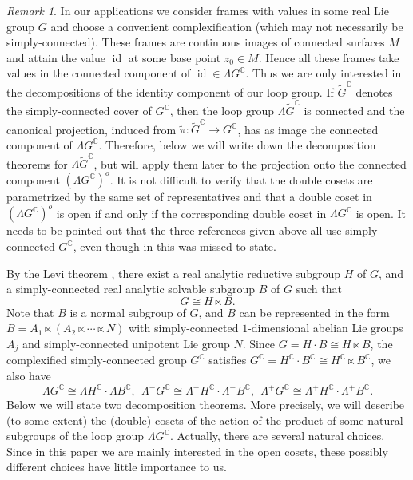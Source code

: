 \documentclass[12pt]{amsart}
\theoremstyle{definition}
\theoremstyle{remark}
\newtheorem{Remark}[Theorem]{Remark}
\numberwithin{equation}{section}
\begin{document}
\begin{Remark} In our applications we consider frames with values in 
 some real Lie group $G$ and choose a convenient complexification 
 (which may not necessarily be simply-connected). These frames 
 are continuous images of connected surfaces $M$ and attain the value ${\operatorname{id}}$ 
 at some base point $z_0 \in M$. Hence all these frames take values in 
 the connected component of  ${\operatorname{id}} \in \Lambda G^{\mathbb{C}}$. 
 Thus we are only interested in the decompositions of the identity component 
 of our loop group.
 If $\tilde{G}^{\mathbb C}$ denotes the simply-connected cover of $G^{\mathbb C}$, then the 
 loop group $\Lambda \tilde{G}^{\mathbb C}$ is connected and the canonical projection,
 induced from $\tilde{\pi} :\tilde{G}^{\mathbb C} \rightarrow G^{\mathbb C}$,  
 has as image the connected component of $\Lambda G^{\mathbb{C}}$. 
 Therefore, below we will write down the decomposition theorems for 
 $\Lambda \tilde{G}^{\mathbb C}$, but will apply them later to the projection  
 onto the connected component $(\Lambda G^{\mathbb C})^o$. 
 It is not difficult to verify that the double cosets are parametrized by 
 the same set of representatives  and that  a double coset in $(\Lambda G^{\mathbb C})^o$ 
 is open if and only if the corresponding double coset in $\Lambda G^{\mathbb{C}}$ 
 is open. It needs to be pointed out that the three references given above all use 
 simply-connected $G^{\mathbb C}$, even though in \cite{BD1} this was missed to state.
\end{Remark}
 By the Levi theorem 
 \cite[Theorem 18.4.3]{Hochschild}, 
 there exist a real analytic reductive subgroup $H$ of $G$, and 
 a simply-connected real analytic solvable subgroup 
 $B$ of $G$ such that   
 \begin{equation}\label{eq:Levi-decomposition}
 G \cong H \ltimes B.
 \end{equation}
 Note that $B$ is a normal subgroup of $G$, and 
 $B$ can be represented in the form  
 $B=A_1\ltimes ( A_2 \ltimes \cdots \ltimes N)$ 
 with simply-connected $1$-dimensional abelian 
 Lie groups $A_j$ and simply-connected  unipotent Lie group $N$. 
 Since $ G = H \cdot B  \cong  H \ltimes B$, the complexified  
 simply-connected group $G^{\mathbb C}$ satisfies 
 $G^{\mathbb C} =H^{\mathbb C} \cdot B^{\mathbb C}  \cong H^{\mathbb C} 
 \ltimes  B^{\mathbb C}$, we also have
\begin{equation*}
 {\Lambda G^{\mathbb C}} \cong {\Lambda H^{\mathbb C}} \cdot {\Lambda B^{\mathbb C}},\ \
  \Lambda^{-}G^{\mathbb C} \cong \Lambda^{-}H^{\mathbb C} \cdot 
 \Lambda^{-} B^{\mathbb C}, \ \
 \Lambda^{+}G^{\mathbb C} \cong \Lambda^{+}H^{\mathbb C} \cdot 
 \Lambda^{+} B^{\mathbb C}.
\end{equation*}
 Below we will state two decomposition theorems. More precisely, we will describe
 (to some extent) the (double) cosets of the action of  the product of some natural 
 subgroups of the loop group  $\Lambda G^{\mathbb C}$. 
 Actually, there are several natural choices. Since in this paper we are mainly interested in the open cosets, 
 these possibly different choices have little importance to us.
\end{document}
